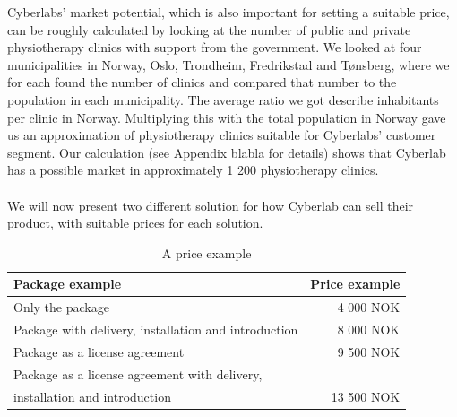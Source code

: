 Cyberlabs’ market potential, which is also important for setting a suitable price, can be roughly calculated by looking at the number of public and private physiotherapy clinics with support from the government. We looked at four municipalities in Norway, Oslo, Trondheim, Fredrikstad and T{ø}nsberg, where we for each found the number of clinics and compared that number to the population in each municipality. The average ratio we got describe inhabitants per clinic in Norway. Multiplying this with the total population in Norway gave us an approximation of physiotherapy clinics suitable for Cyberlabs’ customer segment. Our calculation (see Appendix blabla for details) shows that Cyberlab has a possible market in approximately 1 200 physiotherapy clinics. \\ \\
We will now present two different solution for how Cyberlab can sell their product, with suitable prices for each solution.  
\begin{table}
\centering
    \begin{tabular}{|l|r|}
        \hline
       \textbf{Package example} & \textbf{Price example}  \\ \hline
       Only the package & 4 000 NOK \\ \hline
	   Package with delivery, installation and introduction & 8 000 NOK \\ \hline
	   Package as a license agreement & 9 500 NOK\\ \hline
	   Package as a license agreement with delivery, \\ 
	   installation and introduction & 13 500 NOK \\
        \hline
    \end{tabular}
    \caption[Priceexample]{A price example}
    \label{tab:Priceexample}
\end{table} 

